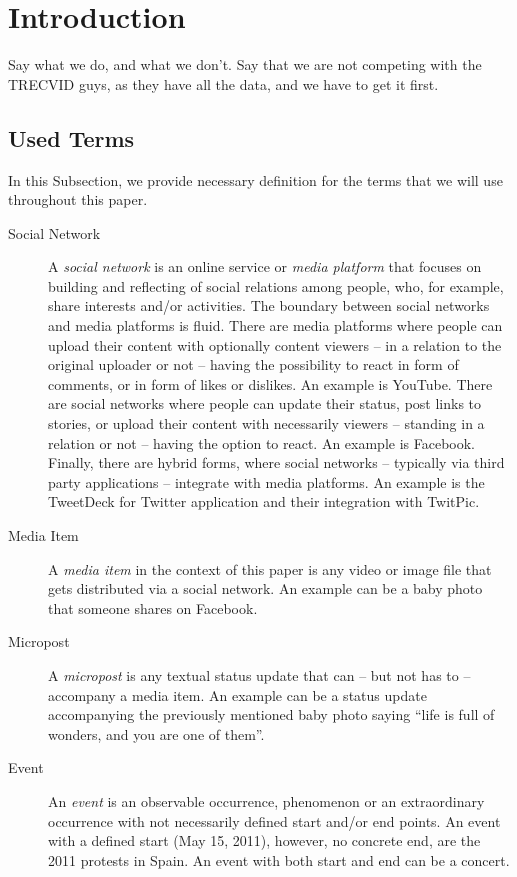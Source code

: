 \documentclass{acm_proc_article-sp}
\let\oldemph\emph
\renewcommand{\emph}[1]{\oldemph{\fontsize{9}{9}\selectfont #1}}
\newcommand{\todo}[1]{\noindent\textcolor{red}{{\bf \{TODO}: #1{\bf \}}}}
\begin{document}
\keywords{\todo{Keywords}}

\section{Introduction} \label{sec:introduction}
Say what we do, and what we don't.
Say that we are not competing with the TRECVID guys, as they have all the data, and we have to get it first.

\subsection{Used Terms}
In this Subsection, we provide necessary definition for the terms that we will use throughout this paper.

\begin{description}
\item[Social Network]
A \emph{social network} is an online service or \emph{media platform} that focuses on building and reflecting of social relations among people, who, for example, share interests and/or activities.
The boundary between social networks and media platforms is fluid.
There are media platforms where people can upload their content with optionally content viewers -- in a relation to the original uploader or not -- having the possibility to react in form of comments, or in form of likes or dislikes.
An example is YouTube.
There are social networks where people can update their status, post links to stories, or upload their content with necessarily viewers -- standing in a relation or not -- having the option to react.
An example is Facebook.
Finally, there are hybrid forms, where social networks -- typically via third party applications -- integrate with media platforms.
An example is the TweetDeck for Twitter application and their integration with TwitPic.

\item[Media Item]
A \emph{media item} in the context of this paper is any video or image file that gets distributed via a social network. An example can be a baby photo that someone shares on Facebook. 

\item[Micropost]
A \emph{micropost} is any textual status update that can -- but not has to -- accompany a media item. An example can be a status update accompanying the previously mentioned baby photo saying ``life is full of wonders, and you are one of them''.

\item[Event]
An \emph{event} is an observable occurrence, phenomenon or an extraordinary occurrence with not necessarily defined start and/or end points. An event with a defined start (May 15, 2011), however, no concrete end, are the 2011 protests in Spain. An event with both start and end can be a concert.
\end{description}
\end{document}
